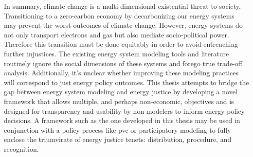 
In summary, climate change is a multi-dimensional existential threat to society.
Transitioning to a zero-carbon economy by decarbonizing our energy systems may
prevent the worst outcomes of climate change. However, energy systems do not
only transport electrons and gas but also mediate socio-political power.
Therefore this transition must be done equitably in order to avoid entrenching
further injustices. The existing energy system modeling tools and literature
routinely ignore the social dimensions of these systems and forego true
trade-off analysis. Additionally, it's unclear whether improving these modeling
practices will correspond to just energy policy outcomes. This thesis attempts
to bridge the gap between energy system modeling and energy justice by
developing a novel framework that allows multiple, and perhaps non-economic,
objectives and is designed for transparency and usability by non-modelers to
inform energy policy decisions. A framework such as the one developed in this
thesis may be used in conjunction with a policy process like \ac{pve} or
participatory modeling to fully enclose the triumvirate of energy justice
tenets: distribution, procedure, and recognition.
